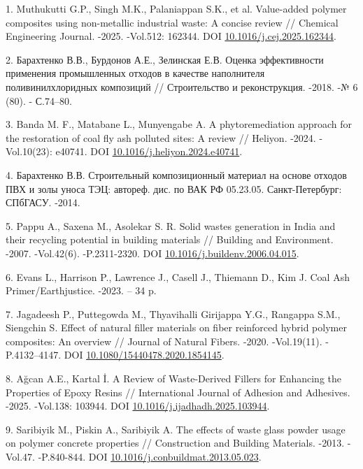 \begin{refs}
1. Muthukutti G.P., Singh M.K., Palaniappan S.K., et al. Value-added
polymer composites using non-metallic industrial waste: A concise
review // Chemical Engineering Journal. -2025. -Vol.512: 162344. DOI
\href{https://ui.adsabs.harvard.edu/link_gateway/2025ChEnJ.51262344M/doi:10.1016/j.cej.2025.162344}{10.1016/j.cej.2025.162344}.

2. Барахтенко В.В., Бурдонов А.Е., Зелинская Е.В. Оценка эффективности
применения промышленных отходов в качестве наполнителя
поливинилхлоридных композиций // Строительство и реконструкция. -2018.
-№ 6 (80). - С.74--80.

3. Banda M. F., Matabane L., Munyengabe A. A phytoremediation approach
for the restoration of coal fly ash polluted sites: A review //
Heliyon. -2024. -Vol.10(23): e40741. DOI
\href{https://doi.org/10.1016/j.heliyon.2024.e40741}{10.1016/j.heliyon.2024.e40741}.

4. Барахтенко В.В. Строительный композиционный материал на основе отходов
ПВХ и золы уноса ТЭЦ: автореф. дис. по ВАК РФ 05.23.05.
Санкт-Петербург: СПбГАСУ. -2014.

5. Pappu A., Saxena M., Asolekar S. R. Solid wastes generation in India
and their recycling potential in building materials // Building and
Environment. -2007. -Vol.42(6). -P.2311-2320. DOI
\href{https://doi.org/10.1016/j.buildenv.2006.04.015}{10.1016/j.buildenv.2006.04.015}.

6. Evans L., Harrison P., Lawrence J., Casell J., Thiemann D., Kim J.
Coal Ash Primer/Earthjustice. -2023. -- 34 p.

7. Jagadeesh P., Puttegowda M., Thyavihalli Girijappa Y.G., Rangappa
S.M., Siengchin S. Effect of natural filler materials on fiber
reinforced hybrid polymer composites: An overview // Journal of
Natural Fibers. -2020. -Vol.19(11). -P.4132--4147. DOI
\href{https://doi.org/10.1080/15440478.2020.1854145}{10.1080/15440478.2020.1854145}.

8. Ağcan A.E., Kartal İ. A Review of Waste-Derived Fillers for Enhancing
the Properties of Epoxy Resins // International Journal of Adhesion
and Adhesives. -2025. -Vol.138: 103944. DOI
\href{https://doi.org/10.1016/j.ijadhadh.2025.103944}{10.1016/j.ijadhadh.2025.103944}.

9. Saribiyik M., Piskin A., Saribiyik A. The effects of waste glass
powder usage on polymer concrete properties // Construction and
Building Materials. -2013. -Vol.47. -P.840-844. DOI
\href{https://doi.org/10.1016/j.conbuildmat.2013.05.023}{10.1016/j.conbuildmat.2013.05.023}.


\end{refs}
